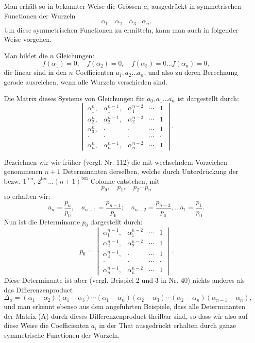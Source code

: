 \documentclass[11pt]{article}
\providecommand{\weberpage}[1]{}
\providecommand{\weq}[2]{\begin{equation}\tag{#1}#2\end{equation}}
\let\Delta\varDelta
\begin{document}
Man erhält so in bekannter Weise die Grössen $a_i$ ausgedrückt in symmetrischen Functionen der Wurzeln
\[
\alpha_1 \quad \alpha_2 \quad \alpha_3 \ldots \alpha_n.
\]
Um diese symmetrischen Functionen zu ermitteln, kann man auch in folgender Weise vorgehen.

Man bildet die $n$ Gleichungen:
\[
f(\alpha_1) = 0, \quad f(\alpha_2) = 0, \quad f(\alpha_3) = 0 \ldots f(\alpha_n) = 0,
\]
die linear sind in den $n$ Coefficienten $a_1, a_2 \ldots a_n$, und also zu deren Berechnung gerade ausreichen, wenn alle Wurzeln verschieden sind.

Die Matrix dieses Systems von Gleichungen für $a_0, a_1 \ldots a_n$ ist dargestellt durch:
\weq{A}{
\begin{vmatrix}
\alpha_1^{n}, & \alpha_1^{n-1}, & \alpha_1^{n-2} & \cdots & 1 \\
\alpha_2^{n}, & \alpha_2^{n-1}, & \alpha_2^{n-2} & \cdots & 1 \\
\alpha_3^{n}, & \cdot & \cdot & \cdots & 1 \\
\cdot & \cdot & \cdot & \cdots & \cdot \\
\alpha_n^{n}, & \alpha_n^{n-1}, & \alpha_n^{n-2} & \cdots & 1
\end{vmatrix}.
}


\weberpage{177}
Bezeichnen wir wie früher (vergl. Nr. 112) die mit wechselndem Vorzeichen genommenen $n+1$ Determinanten derselben, welche durch Unterdrückung der bezw. $1^{\mathrm{ten}}$, $2^{\mathrm{ten}} \ldots (n+1)^{\mathrm{ten}}$ Colonne entstehen, mit
\[
p_0, \quad p_1, \quad p_2 \cdots p_n %
\]
so erhalten wir:
\[
a_n = \frac{p_n}{p_0}, \quad a_{n-1} = \frac{p_{n-1}}{p_0}; \quad a_{n-2} = \frac{p_{n-2}}{p_0}, \ldots a_1 = \frac{p_1}{p_0}.
\]
Nun ist die Determinante $p_0$ dargestellt durch:
\[
p_0 =
\begin{vmatrix}
\alpha_1^{n-1}, & \alpha_1^{n-2} & \cdots & 1 \\
\alpha_2^{n-1}, & \alpha_2^{n-2} & \cdots & 1 \\
\alpha_3^{n-1}, & \cdot & \cdots & 1 \\
\cdot & \cdot & \cdots & \cdot \\
\alpha_n^{n-1}, & \alpha_n^{n-2} & \cdots & 1
\end{vmatrix}.
\]
Diese Determinante ist aber (vergl. Beispiel 2 und 3 in Nr. 40) nichts anderes als das Differenzenproduct
\[
\Delta_\alpha = (\alpha_1-\alpha_2)(\alpha_1-\alpha_3)\cdots(\alpha_1-\alpha_n)
(\alpha_2-\alpha_3)\cdots(\alpha_2-\alpha_n)
(\alpha_{n-1}-\alpha_n),
\]
und man erkennt ebenso aus dem angeführten Beispiele, dass alle Determinanten der Matrix (A) durch dieses Differenzenproduct theilbar sind, so dass wir also auf diese Weise die Coefficienten $a_i$ in der That ausgedrückt erhalten durch ganze symmetrische Functionen der Wurzeln.
\end{document}
